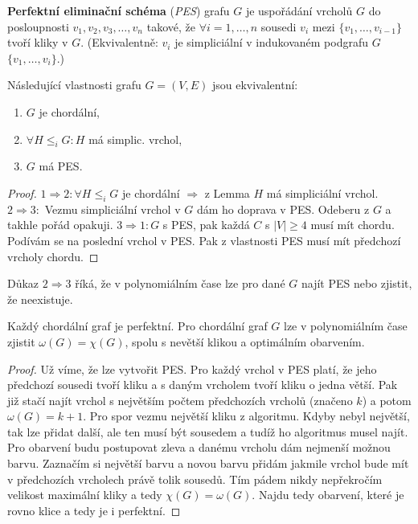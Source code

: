 \begin{definice}
	\textbf{Perfektní eliminační schéma} (\textit{PES}) grafu $G$ je uspořádání vrcholů $G$ do posloupnosti $v_{1}, v_{2}, v_{3}, \dots, v_{n}$ takové, že $\forall i = 1, \dots ,n$ sousedi $v_{i}$ mezi $\{v_{1}, \dots, v_{i-1}\}$ tvoří kliky v $G$. (Ekvivalentně: $v_{i}$ je simpliciální v indukovaném podgrafu $G$ $\{v_{1}, \dots, v_{i}\}$.)
\end{definice}

\begin{veta}
	Následující vlastnosti grafu $G = (V,E)$ jsou ekvivalentní:
	
	\begin{enumerate}
		\item $G$ je chordální,
		\item $\forall H \leq_{i} G: H$ má simplic. vrchol,
		\item $G$ má PES.
	\end{enumerate}
\end{veta}

\begin{proof}
	$1 \Rightarrow 2: \forall H \leq_{i} G$ je chordální $\Rightarrow$ z Lemma $H$ má simpliciální vrchol. $2 \Rightarrow 3:$ Vezmu simpliciální vrchol v $G$ dám ho doprava v PES. Odeberu z $G$ a takhle pořád opakuji. $3 \Rightarrow 1: G$ s PES, pak každá $C$ s $|V| \geq 4$ musí mít chordu. Podívám se na poslední vrchol v PES. Pak z vlastnosti PES musí mít předchozí vrcholy chordu.
\end{proof}

\begin{dusl}
	Důkaz $2 \Rightarrow 3$ říká, že v polynomiálním čase lze pro dané $G$ najít PES nebo zjistit, že neexistuje.
\end{dusl}

\begin{veta}
	Každý chordální graf je perfektní. Pro chordální graf $G$ lze v polynomiálním čase zjistit $\omega(G) = \chi(G)$, spolu s nevětší klikou a optimálním obarvením.
\end{veta}

\begin{proof}
	Už víme, že lze vytvořit PES. Pro každý vrchol v PES platí, že jeho předchozí sousedi tvoří kliku a s daným vrcholem tvoří kliku o jedna větší. Pak již stačí najít vrchol s největším počtem předchozích vrcholů (značeno $k$) a potom $\omega(G) = k+1$. Pro spor vezmu největší kliku z algoritmu. Kdyby nebyl největší, tak lze přidat další, ale ten musí být sousedem a tudíž ho algoritmus musel najít. Pro obarvení budu postupovat zleva a danému vrcholu dám nejmenší možnou barvu. Zaznačím si největší barvu a novou barvu přidám jakmile vrchol bude mít v předchozích vrcholech právě tolik sousedů. Tím pádem nikdy nepřekročím velikost maximální kliky a tedy $\chi(G) = \omega(G)$. Najdu tedy obarvení, které je rovno klice a tedy je i perfektní.
\end{proof}

